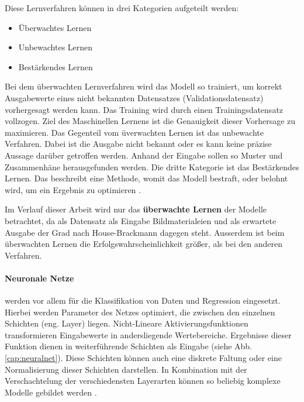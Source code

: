 Diese  Lernverfahren können in drei Kategorien aufgeteilt werden:
\begin{itemize}
  \setlength\itemsep{-0.5em}
\item Überwachtes Lernen
\item Unbewachtes Lernen
\item Bestärkendes Lernen
\end{itemize}

Bei dem überwachten Lernverfahren wird das Modell so trainiert, um korrekt Ausgabewerte eines nicht bekannten Datensatzes (Validationsdatensatz) vorhergesagt werden kann. Das Training wird durch einen Trainingsdatensatz vollzogen. Ziel des Maschinellen Lernens ist die Genauigkeit dieser Vorhersage zu maximieren. Das Gegenteil vom üverwachten Lernen ist das unbewachte Verfahren. Dabei ist die Ausgabe nicht bekannt oder es kann keine präzise Aussage darüber getroffen werden. Anhand der Eingabe sollen so Muster und Zusammenhäne herausgefunden werden. Die dritte Kategorie ist das Bestärkendes Lernen. Das beschreibt eine Methode, womit das Modell bestraft, oder belohnt wird, um ein Ergebnis zu optimieren \cite{machinelearning_1}.

Im Verlauf dieser Arbeit wird nur das \textbf{überwachte Lernen} der Modelle betrachtet, da als Datensatz als Eingabe Bildmaterialeien und als erwartete Ausgabe der Grad nach House-Brackmann dagegen steht. Ausserdem ist beim überwachten Lernen die Erfolgswahrscheinlichkeit größer, als bei den anderen Verfahren.


\paragraph{Neuronale Netze} werden vor allem für die Klassifikation von Daten und Regression eingesetzt. Hierbei werden Parameter des Netzes optimiert, die zwischen den einzelnen Schichten (eng. Layer) liegen. Nicht-Lineare Aktivierungsfunktionen transformieren Eingabewerte in andersliegende Wertebereiche. Ergebnisse dieser Funktion dienen in weiterführende Schichten als Eingabe (siehe Abb. \ref{cap:neuralnet}). Diese Schichten können auch eine diskrete Faltung oder eine Normalisierung dieser Schichten darstellen. In Kombination mit der Verschachtelung der verschiedensten Layerarten können so beliebig komplexe Modelle gebildet werden \cite{machinelearning_3}.


